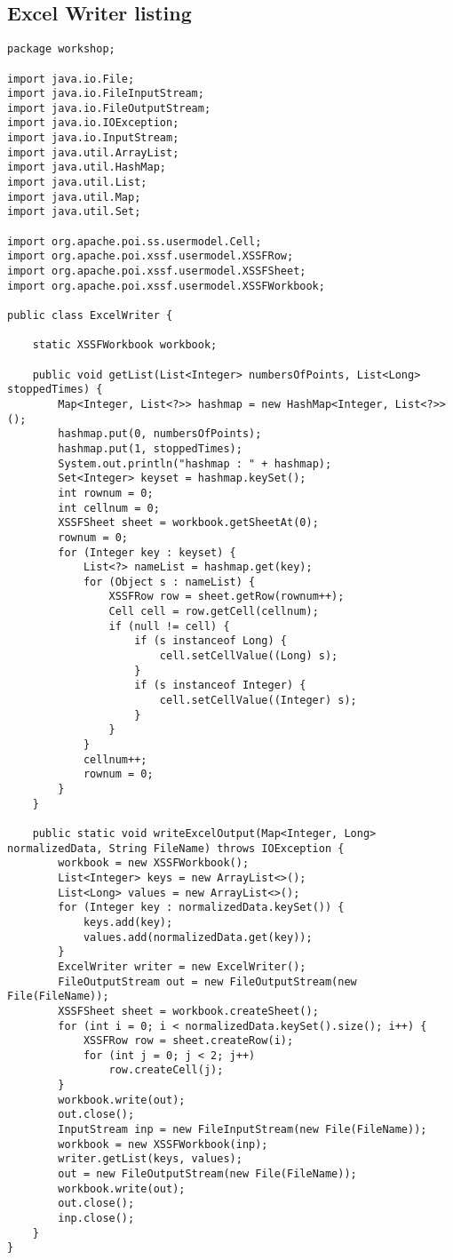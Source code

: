 \pagebreak
\subsection{Excel Writer listing}
\label{subsec: ExcelWriter-listing}
\begin{lstlisting}
package workshop;

import java.io.File;
import java.io.FileInputStream;
import java.io.FileOutputStream;
import java.io.IOException;
import java.io.InputStream;
import java.util.ArrayList;
import java.util.HashMap;
import java.util.List;
import java.util.Map;
import java.util.Set;

import org.apache.poi.ss.usermodel.Cell;
import org.apache.poi.xssf.usermodel.XSSFRow;
import org.apache.poi.xssf.usermodel.XSSFSheet;
import org.apache.poi.xssf.usermodel.XSSFWorkbook;

public class ExcelWriter {

	static XSSFWorkbook workbook;

	public void getList(List<Integer> numbersOfPoints, List<Long> stoppedTimes) {
		Map<Integer, List<?>> hashmap = new HashMap<Integer, List<?>>();
		hashmap.put(0, numbersOfPoints);
		hashmap.put(1, stoppedTimes);
		System.out.println("hashmap : " + hashmap);
		Set<Integer> keyset = hashmap.keySet();
		int rownum = 0;
		int cellnum = 0;
		XSSFSheet sheet = workbook.getSheetAt(0);
		rownum = 0;
		for (Integer key : keyset) {
			List<?> nameList = hashmap.get(key);
			for (Object s : nameList) {
				XSSFRow row = sheet.getRow(rownum++);
				Cell cell = row.getCell(cellnum);
				if (null != cell) {
					if (s instanceof Long) {
						cell.setCellValue((Long) s);
					}
					if (s instanceof Integer) {
						cell.setCellValue((Integer) s);
					}
				}
			}
			cellnum++;
			rownum = 0;
		}
	}
	
	public static void writeExcelOutput(Map<Integer, Long> normalizedData, String FileName) throws IOException {
		workbook = new XSSFWorkbook();
		List<Integer> keys = new ArrayList<>();
		List<Long> values = new ArrayList<>();
		for (Integer key : normalizedData.keySet()) {
			keys.add(key);
			values.add(normalizedData.get(key));
		}
		ExcelWriter writer = new ExcelWriter();
		FileOutputStream out = new FileOutputStream(new File(FileName));
		XSSFSheet sheet = workbook.createSheet();
		for (int i = 0; i < normalizedData.keySet().size(); i++) {
			XSSFRow row = sheet.createRow(i);
			for (int j = 0; j < 2; j++)
				row.createCell(j);
		}
		workbook.write(out);
		out.close();
		InputStream inp = new FileInputStream(new File(FileName));
		workbook = new XSSFWorkbook(inp);
		writer.getList(keys, values);
		out = new FileOutputStream(new File(FileName));
		workbook.write(out);
		out.close();
		inp.close();
	}
}
\end{lstlisting}
